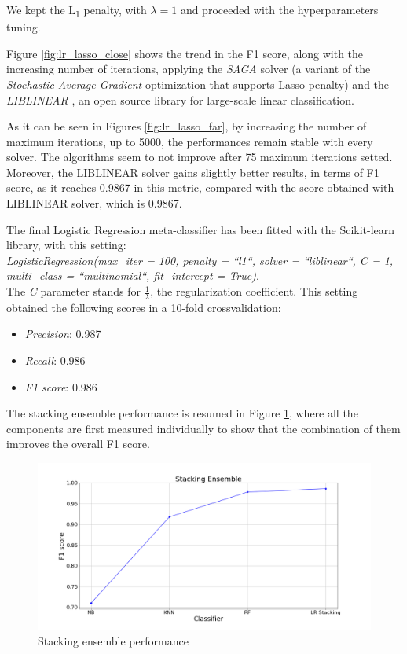 We kept the L\textsubscript{1} penalty, with $ \lambda  = 1 $   and proceeded with the hyperparameters tuning.

Figure \ref{fig:lr_lasso_close} shows the trend in the F1 score, along with the increasing number of iterations, applying the \textit{SAGA} \cite{SAGA} solver (a variant of the \textit{Stochastic Average Gradient} \cite{SAG} optimization that supports Lasso penalty) and the \textit{LIBLINEAR} \cite{Liblinear}, an open source library for large-scale linear classification.

As it can be seen in Figures \ref{fig:lr_lasso_far}, by increasing the number of maximum iterations, up to 5000, the performances remain stable with every solver.
The algorithms seem to not improve after 75 maximum iterations setted.
Moreover, the LIBLINEAR solver gains slightly better results, in terms of F1 score, as it reaches 0.9867 in this metric, compared with the score obtained with LIBLINEAR solver, which is 0.9867.

The final Logistic Regression meta-classifier has been fitted with the Scikit-learn library, with this setting:\\
\textit{LogisticRegression(max\_iter = 100, penalty = ``l1``, solver = ``liblinear``, C = 1, multi\_class = ``multinomial``, fit\_intercept = True)}.\\
The \textit{C} parameter stands for $ \frac{1}{\lambda} $, the regularization coefficient.
This setting obtained the following scores in a 10-fold crossvalidation:
\begin{itemize}
	\item[\PencilRight] \textit{Precision}: 0.987
	\item[\PencilRight] \textit{Recall}: 0.986
	\item[\PencilRight] \textit{F1 score}: 0.986
\end{itemize}

The stacking ensemble performance is resumed in Figure \ref{fig:stacking_performance}, where all the components are first measured individually to show that the combination of them improves the overall F1 score.
\begin{figure}[htp!]
	\includegraphics[width=\columnwidth]{chapter6/figure/stacking_performance.png}
	\caption{Stacking ensemble performance}
	\label{fig:stacking_performance}
\end{figure}

